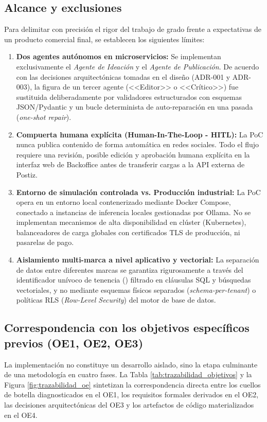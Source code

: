 \documentclass[12pt,oneside]{report}
\newcommand{\code}[1]{\texttt{\detokenize{#1}}}
\begin{document}
\subsection{Alcance y exclusiones}
Para delimitar con precisión el rigor del trabajo de grado frente a expectativas de un producto comercial final, se establecen los siguientes límites:
\begin{enumerate}
    \item \textbf{Dos agentes autónomos en microservicios:} Se implementan exclusivamente el \textit{Agente de Ideación} y el \textit{Agente de Publicación}. De acuerdo con las decisiones arquitectónicas tomadas en el diseño (ADR-001 y ADR-003), la figura de un tercer agente (<<Editor>> o <<Crítico>>) fue sustituida deliberadamente por validadores estructurados con esquemas JSON/Pydantic y un bucle determinista de auto-reparación en una pasada (\textit{one-shot repair}).
    \item \textbf{Compuerta humana explícita (Human-In-The-Loop - HITL):} La PoC nunca publica contenido de forma automática en redes sociales. Todo el flujo requiere una revisión, posible edición y aprobación humana explícita en la interfaz web de Backoffice antes de transferir cargas a la API externa de Postiz.
    \item \textbf{Entorno de simulación controlada vs. Producción industrial:} La PoC opera en un entorno local contenerizado mediante Docker Compose, conectado a instancias de inferencia locales gestionadas por Ollama. No se implementan mecanismos de alta disponibilidad en clúster (Kubernetes), balanceadores de carga globales con certificados TLS de producción, ni pasarelas de pago.
    \item \textbf{Aislamiento multi-marca a nivel aplicativo y vectorial:} La separación de datos entre diferentes marcas se garantiza rigurosamente a través del identificador unívoco de tenencia (\code{brand_id}) filtrado en cláusulas SQL y búsquedas vectoriales, y no mediante esquemas físicos separados (\textit{schema-per-tenant}) o políticas RLS (\textit{Row-Level Security}) del motor de base de datos.
\end{enumerate}

\subsection{Correspondencia con los objetivos específicos previos (OE1, OE2, OE3)}
La implementación no constituye un desarrollo aislado, sino la etapa culminante de una metodología en cuatro fases. La Tabla \ref{tab:trazabilidad_objetivos} y la Figura \ref{fig:trazabilidad_oe} sintetizan la correspondencia directa entre los cuellos de botella diagnosticados en el OE1, los requisitos formales derivados en el OE2, las decisiones arquitectónicas del OE3 y los artefactos de código materializados en el OE4.
\end{document}

